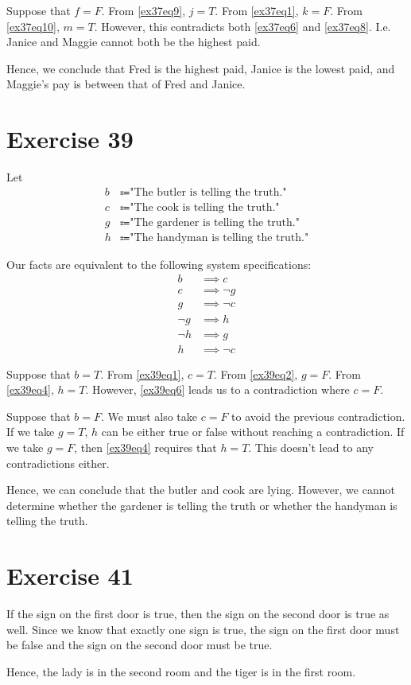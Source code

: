 \documentclass{article}
\begin{document}
Suppose that $f = F$. From \eqref{ex37eq9}, $j = T$. From \eqref{ex37eq1}, $k = F$. From \eqref{ex37eq10}, $m = T$. However, this contradicts both \eqref{ex37eq6} and \eqref{ex37eq8}. I.e. Janice and Maggie cannot both be the highest paid.

Hence, we conclude that Fred is the highest paid, Janice is the lowest paid, and Maggie's pay is between that of Fred and Janice.

\pagebreak

\section{Exercise 39}
Let
\begin{align*}
	b & \Coloneqq \text{"The butler is telling the truth."}   \\
	c & \Coloneqq \text{"The cook is telling the truth."}     \\
	g & \Coloneqq \text{"The gardener is telling the truth."} \\
	h & \Coloneqq \text{"The handyman is telling the truth."}
\end{align*}

Our facts are equivalent to the following system specifications:
\begin{align}
	b      & \implies c \label{ex39eq1}      \\
	c      & \implies \neg g \label{ex39eq2} \\
	g      & \implies \neg c \label{ex39eq3} \\
	\neg g & \implies h \label{ex39eq4}      \\
	\neg h & \implies g \label{ex39eq5}      \\
	h      & \implies \neg c \label{ex39eq6}
\end{align}

Suppose that $b = T$. From \eqref{ex39eq1}, $c = T$.  From \eqref{ex39eq2}, $g = F$.  From \eqref{ex39eq4}, $h = T$. However, \eqref{ex39eq6} leads us to a contradiction where $c = F$.

Suppose that $b = F$.  We must also take $c = F$ to avoid the previous contradiction.  If we take $g = T$, $h$ can be either true or false without reaching a contradiction.  If we take $g = F$, then \eqref{ex39eq4} requires that $h = T$.  This doesn't lead to any contradictions either.

Hence, we can conclude that the butler and cook are lying. However, we cannot determine whether the gardener is telling the truth or whether the handyman is telling the truth.

\pagebreak

\section{Exercise 41}
If the sign on the first door is true, then the sign on the second door is true as well. Since we know that exactly one sign is true, the sign on the first door must be false and the sign on the second door must be true.

Hence, the lady is in the second room and the tiger is in the first room.
\end{document}
